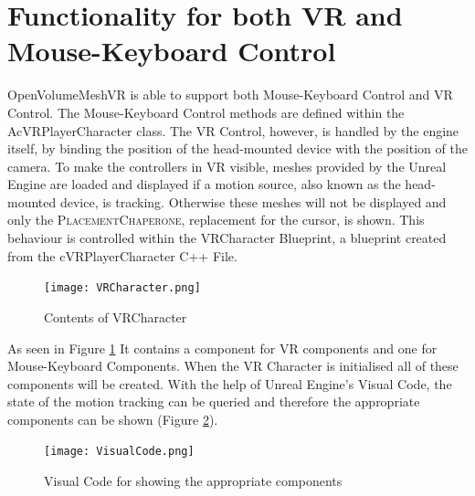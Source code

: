 \documentclass{report}
\begin{document}
	\section{Functionality for both VR and Mouse-Keyboard Control}
	\startsection
		OpenVolumeMeshVR is able to support both Mouse-Keyboard Control and VR Control. The Mouse-Keyboard Control methods are defined within the AcVRPlayerCharacter class. The VR Control, however, is handled by the engine itself, by binding the position of the head-mounted device with the position of the camera. To make the controllers in VR visible, meshes provided by the Unreal Engine are loaded and displayed if a motion source, also known as the head-mounted device, is tracking. Otherwise these meshes will not be displayed and only the \textsc{PlacementChaperone}, replacement for the cursor, is shown. This behaviour is controlled within the VRCharacter Blueprint, a blueprint created from the cVRPlayerCharacter C++ File.
		\begin{figure}[H]
			\begin{center}
				\texttt{[image: VRCharacter.png]} 
				\caption{Contents of VRCharacter}
				\label{VRCharacterContent}
			\end{center}
		\end{figure}
		\noindent As seen in Figure \ref{VRCharacterContent} It contains a component for VR components and one for Mouse-Keyboard Components. When the VR Character is initialised all of these components will be created. With the help of Unreal Engine's Visual Code, the state of the motion tracking can be queried and therefore the appropriate components can be shown (Figure \ref{VisualCode}).
		\begin{figure}[H]
			\begin{center}
				\texttt{[image: VisualCode.png]} 
				\caption{Visual Code for showing the appropriate components}
				\label{VisualCode}
			\end{center}
		\end{figure}
	\closesection
	
\end{document}
